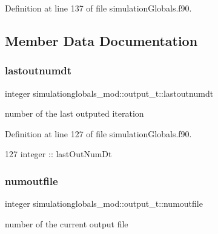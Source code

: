 Definition at line 137 of file simulation\+Globals.\+f90.



\subsection{Member Data Documentation}
\mbox{\label{structsimulationglobals__mod_1_1output__t_abe175b060fb276ed8591f82c2e052393}} 
\subsubsection{\texorpdfstring{lastoutnumdt}{lastoutnumdt}}
{\footnotesize\ttfamily integer simulationglobals\+\_\+mod\+::output\+\_\+t\+::lastoutnumdt\hspace{0.3cm}{\ttfamily [private]}}



number of the last outputed iteration 



Definition at line 127 of file simulation\+Globals.\+f90.


\begin{DoxyCode}
127         \textcolor{keywordtype}{integer} :: lastOutNumDt
\end{DoxyCode}
\mbox{\label{structsimulationglobals__mod_1_1output__t_a1df9064be51b29e5cb017c161db70511}} 
\subsubsection{\texorpdfstring{numoutfile}{numoutfile}}
{\footnotesize\ttfamily integer simulationglobals\+\_\+mod\+::output\+\_\+t\+::numoutfile\hspace{0.3cm}{\ttfamily [private]}}



number of the current output file 



